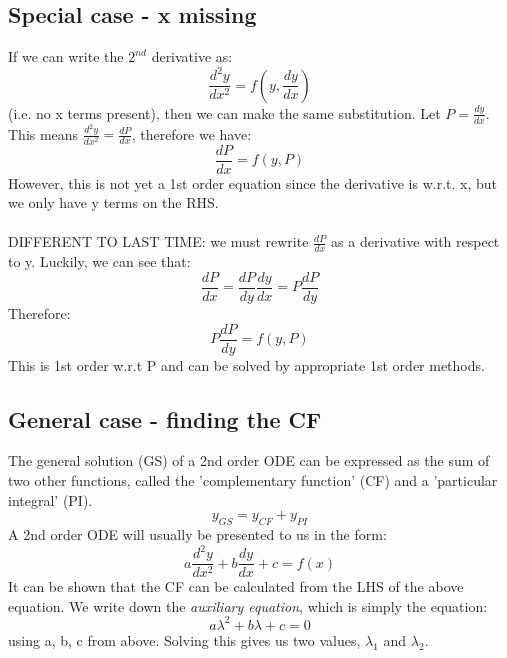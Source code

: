 \documentclass{scrartcl}
\begin{document}
\subsection{Special case - x missing}
If we can write the $ 2^{nd} $ derivative as:
\begin{equation}
\frac{d^{2}y}{dx^{2}} = f(y, \frac{dy}{dx})
\end{equation}
(i.e. no x terms present), then we can make the same substitution. Let $ P = \frac{dy}{dx} $. This means $ \frac{d^{2}y}{dx^{2}} = \frac{dP}{dx} $, therefore we have:
\begin{equation}
\frac{dP}{dx} = f(y, P)
\end{equation}
However, this is not yet a 1st order equation since the derivative is w.r.t. x, but we only have y terms on the RHS.
\\\\
DIFFERENT TO LAST TIME: we must rewrite $ \frac{dP}{dx} $ as a derivative with respect to y. Luckily, we can see that:
\begin{equation}
\frac{dP}{dx} = \frac{dP}{dy}\frac{dy}{dx} = P\frac{dP}{dy}
\end{equation}
Therefore:
\begin{equation}
P\frac{dP}{dy} = f(y, P)
\end{equation}
This is 1st order w.r.t P and can be solved by appropriate 1st order methods.

\subsection{General case - finding the CF}
The general solution (GS) of a 2nd order ODE can be expressed as the sum of two other functions, called the 'complementary function' (CF) and a 'particular integral' (PI).
\begin{equation}
y_{GS} = y_{CF} + y_{PI}
\end{equation} 
A 2nd order ODE will usually be presented to us in the form:
\begin{equation} \label{secondordergeneralform}
a\frac{d^{2}y}{dx^{2}} + b\frac{dy}{dx} + c = f(x)
\end{equation}
It can be shown that the CF can be calculated from the LHS of the above equation. We write down the \emph{auxiliary equation}, which is simply the equation:
\begin{equation}
a\lambda^{2} + b\lambda + c = 0
\end{equation}
using a, b, c from above. Solving this gives us two values, $ \lambda_{1} $ and $ \lambda_{2} $.
\end{document}
